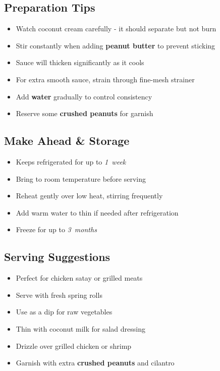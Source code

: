 \documentclass[11pt,letterpaper]{article}
\begin{document}
{\begin{multicols}{2}
\subsection*{Preparation Tips}
\begin{itemize}
    \item Watch coconut cream carefully - it should separate but not burn
    \item Stir constantly when adding \textbf{peanut butter} to prevent sticking
    \item Sauce will thicken significantly as it cools
    \item For extra smooth sauce, strain through fine-mesh strainer
    \item Add \textbf{water} gradually to control consistency
    \item Reserve some \textbf{crushed peanuts} for garnish
\end{itemize}

\subsection*{Make Ahead \& Storage}
\begin{itemize}
    \item Keeps refrigerated for up to \textit{1~week}
    \item Bring to room temperature before serving
    \item Reheat gently over low heat, stirring frequently
    \item Add warm water to thin if needed after refrigeration
    \item Freeze for up to \textit{3~months}
\end{itemize}

\subsection*{Serving Suggestions}
\begin{itemize}
    \item Perfect for chicken satay or grilled meats
    \item Serve with fresh spring rolls
    \item Use as a dip for raw vegetables
    \item Thin with coconut milk for salad dressing
    \item Drizzle over grilled chicken or shrimp
    \item Garnish with extra \textbf{crushed peanuts} and cilantro
\end{itemize}

\end{multicols}
}
\end{document}
